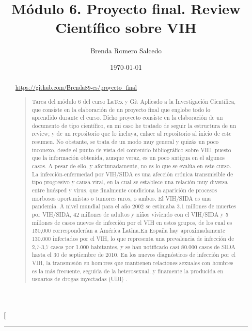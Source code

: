 \documentclass[a4paper,twocolumn,10pt]{article}
\begin{document}
\title{Módulo 6. Proyecto final. Review Científico sobre VIH}
\author{Brenda Romero Salcedo}
\date{\today}
\twocolumn[
\begin{@twocolumnfalse}
\vspace*{-3cm}
\maketitle
\vspace*{-1cm}
\begin{center}\rule{0.9\textwidth}{0.1mm}\end{center}
\begin{abstract}
\begin{center}
\large
\url{https://github.com/Brenda89-es/proyecto_final}
\end{center}
\begin{quote}
\normalsize 
Tarea del módulo 6 del curso LaTex y Git Aplicado a la Investigación Científica, que consiste en la elaboración de un proyecto final que englobe todo lo aprendido durante el curso. Dicho proyecto consiste en la elaboración de un documento de tipo científico, en mi caso he tratado de seguir la estructura de un review; y de un repositorio que lo incluya, enlace al repositorio al inicio de este resumen. No obstante, se trata de un modo muy general y quizás un poco inconexo, desde el punto de vista del contenido bibliográfico sobre VIH, puesto que la información obtenida, aunque veraz, es un poco antigua en el algunos casos. A pesar de ello, y afortunadamente, no es lo que se evalúa en este curso. \\
La infección-enfermedad por VIH/SIDA es una afección crónica transmisible de tipo progresivo y causa viral, en la cual se establece una relación muy diversa entre huésped y virus, que finalmente condiciona la aparición de procesos morbosos oportunistas o tumores raros, o ambos\cite{Castillo2004}.
El VIH/SIDA es una pandemia. A nivel mundial para el año 2002 se estimaba 3.1 millones de muertes por VIH/SIDA, 42 millones de adultos y niños viviendo con el VIH/SIDA y 5 millones de casos nuevos de infección por el VIH en estos grupos, de los cual es 150,000 corresponderían a América Latina\cite{LinaMariaVera2004}.En España hay aproximadamente 130.000 infectados por el VIH, lo que representa una prevalencia de infección de 2,7-3,7 casos por 1.000 habitantes, y se han notificado casi 80.000 casos de SIDA hasta el 30 de septiembre de 2010. En los nuevos diagnósticos de infección por el VIH, la transmisión en hombres que mantienen relaciones sexuales con hombres es la más frecuente, seguida de la heterosexual, y finamente la producida en usuarios de drogas inyectadas (UDI) \cite{Marco2012}. \\

\end{quote}
\end{abstract}
\end{@twocolumnfalse}
\end{document}
